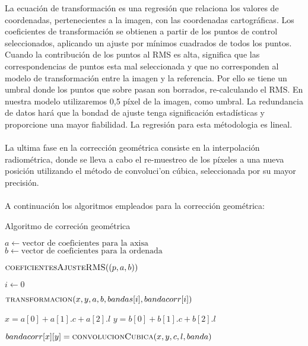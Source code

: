 La ecuaci\'on de transformaci\'on es una regresi\'on que relaciona los valores de coordenadas, pertenecientes a la imagen, con las coordenadas cartogr\'aficas. Los coeficientes de transformaci\'on se obtienen a partir de los puntos de control seleccionados, aplicando un ajuste por m\'inimos cuadrados de todos los puntos. Cuando la contribuci\'on de los puntos al RMS es alta, significa que las correspondencias de puntos esta mal seleccionada y que no corresponden al modelo de transformaci\'on entre la imagen y la referencia. Por ello se tiene un umbral donde los puntos que sobre pasan son borrados, re-calculando el RMS. En nuestra modelo utilizaremos 0,5 p\'ixel de la imagen, como umbral. La redundancia de datos har\'a que la bondad de ajuste tenga significaci\'on estad\'isticas y proporcione una mayor fiabilidad. La regresi\'on para esta m\'etodologia es lineal.\\~\\
La ultima fase en la correcci\'on geom\'etrica consiste en la interpolaci\'on radiom\'etrica, donde se lleva a cabo el re-muestreo de los p\'ixeles a una nueva posici\'on utilizando el m\'etodo de convoluci'on c\'ubica, seleccionada por su mayor precisi\'on.\\~\\
A continuaci\'on los algoritmos empleados para la correcci\'on geom\'etrica:
\begin{algorithm}
	\caption{Algoritmo de correci\'on geom\'etrica}
	\label{alg:corrGEom}
	\begin{algorithmic}[1]
		\Statex
		
		\State $a \gets \text{vector de coeficientes para la axisa}$
		\State $b \gets \text{vector de coeficientes para la ordenada}$
		
		\State $\textsc{coeficientesAjusteRMS}((p,a,b))$
		
		\State 
		\State $i \gets 0$
		
					\State $\textsc{transformacion}(x,y,a,b,bandas[i],bandacorr[i])$
				\EndFor
			\EndFor
		\EndWhile
		
		\EndFunction
		
		\State
		\State
			\State $x = a[0]+a[1].c+a[2].l$
			\State $y = b[0]+b[1].c+b[2].l$
			
			\State $bandacorr[x][y]=\textsc{convolucionCubica}(x,y,c,l,banda)$
			
		\EndProcedure
	\end{algorithmic}
\end{algorithm}


